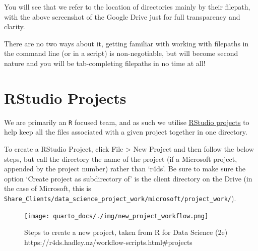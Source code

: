 \documentclass[
  letterpaper,
  DIV=11,
  numbers=noendperiod]{scrreprt}
\begin{document}
\begin{tcolorbox}[enhanced jigsaw, opacitybacktitle=0.6, breakable, title=\textcolor{quarto-callout-caution-color}{\faFire}\hspace{0.5em}{File paths}, arc=.35mm, colframe=quarto-callout-caution-color-frame, colbacktitle=quarto-callout-caution-color!10!white, left=2mm, bottomrule=.15mm, opacityback=0, toprule=.15mm, bottomtitle=1mm, toptitle=1mm, titlerule=0mm, leftrule=.75mm, colback=white, rightrule=.15mm, coltitle=black]

You will see that we refer to the location of directories mainly by
their filepath, with the above screenshot of the Google Drive just for
full transparency and clarity.

There are no two ways about it, getting familiar with working with
filepaths in the command line (or in a script) is non-negotiable, but
will become second nature and you will be tab-completing filepaths in no
time at all!

\end{tcolorbox}

\section{RStudio Projects}\label{rstudio-projects}

We are primarily an \texttt{R} focused team, and as such we utilise
\href{https://support.posit.co/hc/en-us/articles/200526207-Using-RStudio-Projects}{RStudio
projects} to help keep all the files associated with a given project
together in one directory.

To create a RStudio Project, click File \textgreater{} New Project and
then follow the below steps, but call the directory the name of the
project (if a Microsoft project, appended by the project number) rather
than `r4ds'. Be sure to make sure the option `Create project as
subdirectory of' is the client directory on the Drive (in the case of
Microsoft, this is
\texttt{Share\_Clients/data\_science\_project\_work/microsoft/project\_work/}).

\begin{figure}[H]

{\centering \texttt{[image: quarto\_docs/./img/new\_project\_workflow.png]}

}

\caption{Steps to create a new project, taken from R for Data Science
(2e) https://r4ds.hadley.nz/workflow-scripts.html\#projects}

\end{figure}%
\end{document}
